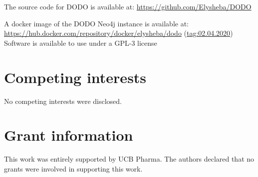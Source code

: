 \documentclass[9pt,a4paper,]{extarticle}
\begin{document}
The source code for DODO is available at:
\url{https://github.com/Elysheba/DODO}

A docker image of the DODO Neo4j instance is available at:
\url{https://hub.docker.com/repository/docker/elysheba/dodo} (\url{tag:02.04.2020})
Software is available to use under a GPL-3 license

\hypertarget{competing-interests}{%
\section{Competing interests}\label{competing-interests}}

No competing interests were disclosed.

\hypertarget{grant-information}{%
\section{Grant information}\label{grant-information}}

This work was entirely supported by UCB Pharma.
The authors declared that no grants were involved in supporting this work.

{\small}
\end{document}
